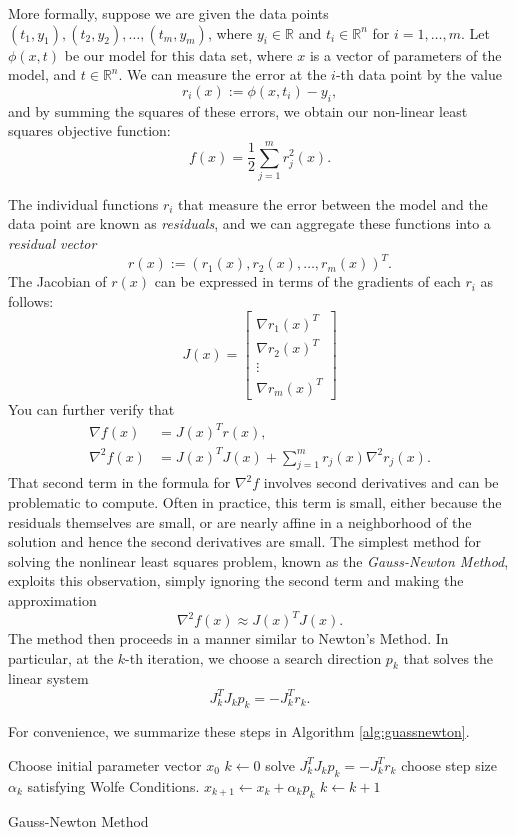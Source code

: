 More formally, suppose we are given the data points $(t_1, y_1), (t_2, y_2), \ldots, (t_m, y_m)$, where $y_i \in \mathbb{R}$
and $t_i \in \mathbb{R}^n$ for $i = 1, \ldots, m$. Let $\phi(x, t)$ be our model for this data set, where $x$ is
a vector of parameters of the model, and $t \in \mathbb{R}^n$. We can measure the error at the $i$-th data point by the value
$$r_i(x) := \phi(x, t_i) - y_i,$$ and by summing the squares of these errors, we obtain our non-linear least squares objective
function:
$$
f(x) = \frac{1}{2} \displaystyle \sum_{j=1}^m  r_j^2(x).
$$

The individual functions $r_i$ that measure the error between the model and the data point are known as \emph{residuals},
and we can aggregate these functions into a \emph{residual vector}
$$
r(x) := (r_1(x), r_2(x), \ldots, r_m(x))^T.
$$
The Jacobian of $r(x)$ can be expressed in terms of the gradients of each $r_i$ as follows:
$$
J(x) = \begin{bmatrix} \nabla r_1(x)^T \\ \nabla r_2(x)^T \\ \vdots \\ \nabla r_m(x)^T \end{bmatrix}
$$
You can further verify that
\begin{align*}
\nabla f(x) &= J(x)^T r(x), \\
\nabla^2 f(x) &= J(x)^TJ(x) + \displaystyle \sum_{j=1}^m r_j(x) \nabla^2r_j(x).
\end{align*}
That second term in the formula for $\nabla^2 f$ involves second derivatives and can be problematic to compute. Often in practice,
this term is small, either because the residuals themselves are small, or are nearly affine in a neighborhood of the solution and
hence the second derivatives are small.
The simplest method for solving the nonlinear least squares problem, known as the \emph{Gauss-Newton Method}, exploits this
observation, simply ignoring the second term and making the approximation
$$
\nabla^2 f(x) \approx J(x)^TJ(x).
$$
The method then proceeds in a manner similar to Newton's Method. In particular, at the $k$-th iteration, we choose a search
direction $p_k$ that solves the linear system
$$
J_k^TJ_kp_k = -J_k^Tr_k.
$$

For convenience, we summarize these steps in Algorithm \ref{alg:guassnewton}.
\begin{algorithm}
\begin{algorithmic}[1]
    \State \textrm{Choose initial parameter vector } $x_0$
    \State $k \gets 0$
        \State \textrm{solve } $J_k^TJ_kp_k = -J_k^Tr_k$
        \State \textrm{choose step size } $\alpha_k$ \textrm{ satisfying Wolfe Conditions.}
        \State $x_{k+1} \gets x_k + \alpha_kp_k$
        \State $k \gets k+1$
    \EndWhile
\EndProcedure
\end{algorithmic}
\caption{Gauss-Newton Method}
\label{alg:guassnewton}
\end{algorithm}

